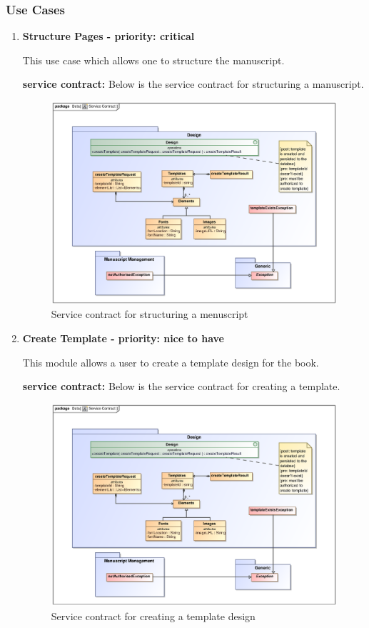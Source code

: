 \subsubsection{Use Cases}
\begin{enumerate}
\item \textbf{Structure Pages - priority: critical}
\par{This use case which allows one to structure the  manuscript.}
\par{\textbf{service contract:} Below is the service contract for structuring a manuscript.
}
\begin{figure}[h]
\includegraphics[scale=0.5]{epsImages/Design/createTemplateServiceContract.eps}
\caption{Service contract for structuring a menuscript}
\end{figure}

\item \textbf{Create Template - priority: nice to have}
\par{This module allows a user to create a template design for the book.}
\par{\textbf{service contract:} Below is the service contract for creating a template.
}
 \begin{figure}[h]
\includegraphics[scale=0.5]{epsImages/Design/createTemplateServiceContract.eps}
\caption{Service contract for creating a template design}
\end{figure}


\end{enumerate}
